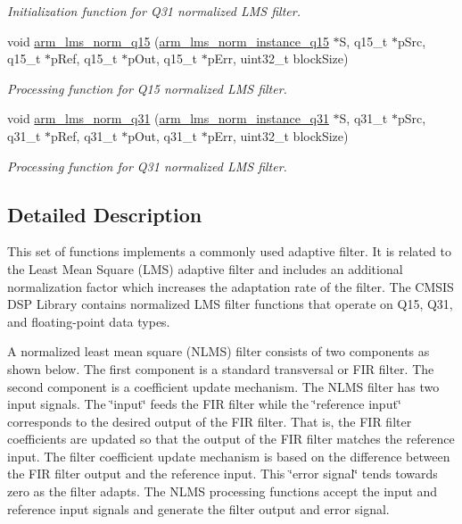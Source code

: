 \begin{DoxyCompactItemize}
\begin{DoxyCompactList}\small\item\em Initialization function for Q31 normalized L\-M\-S filter. \end{DoxyCompactList}\item 
void \hyperlink{group___l_m_s___n_o_r_m_gad47486a399dedb0bc85a5990ec5cf981}{arm\-\_\-lms\-\_\-norm\-\_\-q15} (\hyperlink{structarm__lms__norm__instance__q15}{arm\-\_\-lms\-\_\-norm\-\_\-instance\-\_\-q15} $\ast$S, q15\-\_\-t $\ast$p\-Src, q15\-\_\-t $\ast$p\-Ref, q15\-\_\-t $\ast$p\-Out, q15\-\_\-t $\ast$p\-Err, uint32\-\_\-t block\-Size)
\begin{DoxyCompactList}\small\item\em Processing function for Q15 normalized L\-M\-S filter. \end{DoxyCompactList}\item 
void \hyperlink{group___l_m_s___n_o_r_m_ga7128775e99817c183a7d7ad34e8b6e05}{arm\-\_\-lms\-\_\-norm\-\_\-q31} (\hyperlink{structarm__lms__norm__instance__q31}{arm\-\_\-lms\-\_\-norm\-\_\-instance\-\_\-q31} $\ast$S, q31\-\_\-t $\ast$p\-Src, q31\-\_\-t $\ast$p\-Ref, q31\-\_\-t $\ast$p\-Out, q31\-\_\-t $\ast$p\-Err, uint32\-\_\-t block\-Size)
\begin{DoxyCompactList}\small\item\em Processing function for Q31 normalized L\-M\-S filter. \end{DoxyCompactList}\end{DoxyCompactItemize}


\subsection{Detailed Description}
This set of functions implements a commonly used adaptive filter. It is related to the Least Mean Square (L\-M\-S) adaptive filter and includes an additional normalization factor which increases the adaptation rate of the filter. The C\-M\-S\-I\-S D\-S\-P Library contains normalized L\-M\-S filter functions that operate on Q15, Q31, and floating-\/point data types.

A normalized least mean square (N\-L\-M\-S) filter consists of two components as shown below. The first component is a standard transversal or F\-I\-R filter. The second component is a coefficient update mechanism. The N\-L\-M\-S filter has two input signals. The \char`\"{}input\char`\"{} feeds the F\-I\-R filter while the \char`\"{}reference input\char`\"{} corresponds to the desired output of the F\-I\-R filter. That is, the F\-I\-R filter coefficients are updated so that the output of the F\-I\-R filter matches the reference input. The filter coefficient update mechanism is based on the difference between the F\-I\-R filter output and the reference input. This \char`\"{}error signal\char`\"{} tends towards zero as the filter adapts. The N\-L\-M\-S processing functions accept the input and reference input signals and generate the filter output and error signal. 

